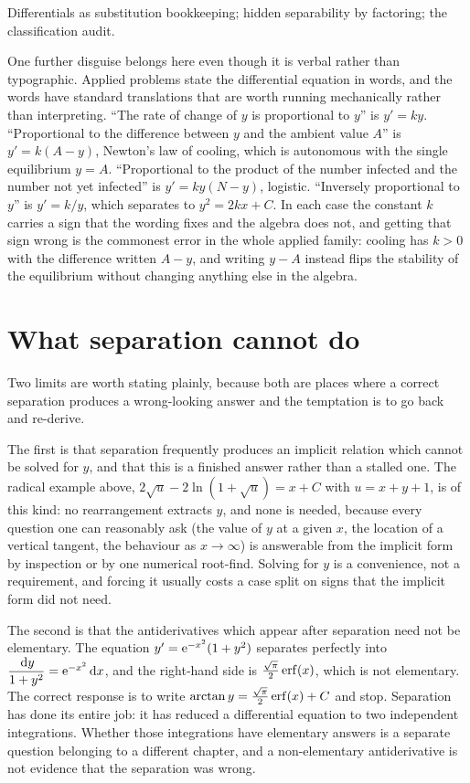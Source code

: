 \begin{seealsob}Differentials as substitution bookkeeping; hidden separability by factoring; the classification audit.\end{seealsob}

One further disguise belongs here even though it is verbal rather than typographic. Applied problems state the differential equation in words, and the words have standard translations that are worth running mechanically rather than interpreting. ``The rate of change of $y$ is proportional to $y$'' is $y'=ky$. ``Proportional to the difference between $y$ and the ambient value $A$'' is $y'=k(A-y)$, Newton's law of cooling, which is autonomous with the single equilibrium $y=A$. ``Proportional to the product of the number infected and the number not yet infected'' is $y'=ky(N-y)$, logistic. ``Inversely proportional to $y$'' is $y'=k/y$, which separates to $y^{2}=2kx+C$. In each case the constant $k$ carries a sign that the wording fixes and the algebra does not, and getting that sign wrong is the commonest error in the whole applied family: cooling has $k>0$ with the difference written $A-y$, and writing $y-A$ instead flips the stability of the equilibrium without changing anything else in the algebra.

\section{What separation cannot do}

Two limits are worth stating plainly, because both are places where a correct separation produces a wrong-looking answer and the temptation is to go back and re-derive.

The first is that separation frequently produces an implicit relation which cannot be solved for $y$, and that this is a finished answer rather than a stalled one. The radical example above, $2\sqrt u-2\ln(1+\sqrt u)=x+C$ with $u=x+y+1$, is of this kind: no rearrangement extracts $y$, and none is needed, because every question one can reasonably ask (the value of $y$ at a given $x$, the location of a vertical tangent, the behaviour as $x\to\infty$) is answerable from the implicit form by inspection or by one numerical root-find. Solving for $y$ is a convenience, not a requirement, and forcing it usually costs a case split on signs that the implicit form did not need.

The second is that the antiderivatives which appear after separation need not be elementary. The equation $y'=\mathrm{e}^{-x^{2}}(1+y^{2})$ separates perfectly into $\dfrac{\,\mathrm{d} y}{1+y^{2}}=\mathrm{e}^{-x^{2}}\,\mathrm{d} x$, and the right-hand side is $\tfrac{\sqrt\pi}{2}\operatorname{erf}(x)$, which is not elementary. The correct response is to write $\arctan y=\tfrac{\sqrt\pi}{2}\operatorname{erf}(x)+C$ and stop. Separation has done its entire job: it has reduced a differential equation to two independent integrations. Whether those integrations have elementary answers is a separate question belonging to a different chapter, and a non-elementary antiderivative is not evidence that the separation was wrong.

